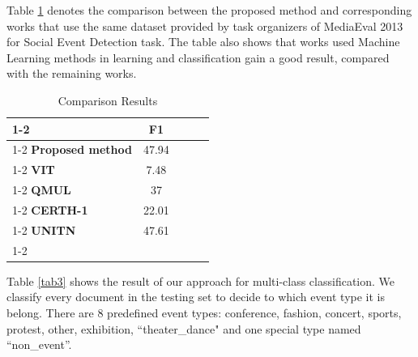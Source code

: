 \documentclass{llncs}
\begin{document}
Table \ref{tab2} denotes the comparison between the proposed method and corresponding works that use the same dataset provided by task organizers of MediaEval 2013 for Social Event Detection task. The table also shows that works used Machine Learning methods in learning and classification gain a good result, compared with the remaining works. 

\begin{table}[htb]
\caption{Comparison Results}
\begin{center}
\begin{tabular}{|l|c|lll}
\cline{1-2}
                        & \textbf{F1} &  &  &  \\ \cline{1-2}
\textbf{Proposed method} & 47.94       &  &  &  \\ \cline{1-2}
\textbf{VIT\cite{itikavit}}     & 7.48        &  &  &  \\ \cline{1-2}
\textbf{QMUL\cite{brenner2012social}}    & 37          &  &  &  \\ \cline{1-2}
\textbf{CERTH-1\cite{schinas2012certh}} & 22.01       &  &  &  \\ \cline{1-2}
\textbf{UNITN\cite{daoICMR14}}   & 47.61       &  &  &  \\ \cline{1-2}
\end{tabular}
\end{center}
\label{tab2}
\end{table}

Table \ref{tab3} shows the result of our approach for multi-class classification. We classify every document in the testing set to decide to which event type it is belong. There are 8 predefined event types: conference, fashion, concert, sports, protest, other, exhibition, “theater\_dance" and one special type named “non\_event”.
\end{document}
